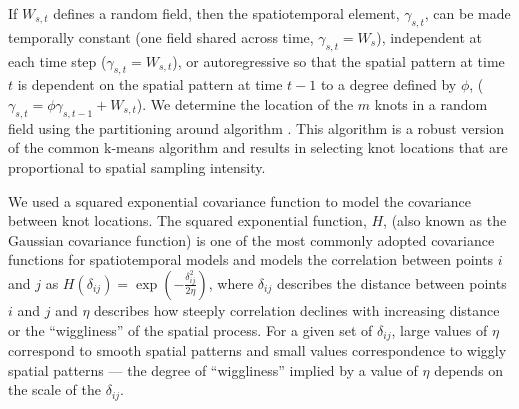 \documentclass[12pt,english]{article}
\begin{document}
\begin{spacing}{1.5}
If $W_{s,t}$ defines a random field, then the spatiotemporal element,
$\gamma_{s,t}$, can be made temporally constant (one field shared across time,
$\gamma_{s,t} = W_{s}$), independent at each time step ($\gamma_{s,t} =
W_{s,t}$), or autoregressive so that the spatial pattern at time $t$ is
dependent on the spatial pattern at time $t-1$ to a degree defined by $\phi$,
($\gamma_{s,t} = \phi \gamma_{s,t-1} + W_{s,t}$).
We determine the location of the $m$ knots in a random field
using the partitioning around
algorithm \citep[the \texttt{pam} function in the R package
\textbf{cluster};][]{reynolds2006}. This algorithm is a robust version of the
common k-means algorithm and results in selecting knot locations that are
proportional to spatial sampling intensity.

We used a squared exponential covariance function to model the covariance
between knot locations. The squared exponential function, $H$, (also known as
the Gaussian covariance function) is one of the most commonly adopted
covariance functions for spatiotemporal models and models the correlation
between points $i$ and $j$ as $H(\delta_{ij}) = \exp
\left(-\frac{\delta_{ij}^2}{2 \eta} \right)$, where $\delta_{ij}$ describes the
distance between points $i$ and $j$ and $\eta$ describes how steeply
correlation declines with increasing distance or the ``wiggliness'' of the
spatial process. For a given set of $\delta_{ij}$, large values of $\eta$
correspond to smooth spatial patterns and small values correspondence to wiggly
spatial patterns --- the degree of ``wiggliness'' implied by a value of $\eta$
depends on the scale of the $\delta_{ij}$.


\end{spacing}
\end{document}
